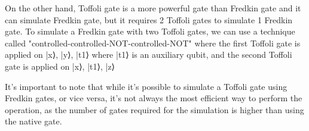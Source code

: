 On the other hand, Toffoli gate is a more powerful gate than Fredkin gate and it can simulate Fredkin gate, but it requires 2 Toffoli gates to simulate 1 Fredkin gate. To simulate a Fredkin gate with two Toffoli gates, we can use a technique called "controlled-controlled-NOT-controlled-NOT" where the first Toffoli gate is applied on |x⟩, |y⟩, |t1⟩ where |t1⟩ is an auxiliary qubit, and the second Toffoli gate is applied on |x⟩, |t1⟩, |z⟩

It's important to note that while it's possible to simulate a Toffoli gate using Fredkin gates, or vice versa, it's not always the most efficient way to perform the operation, as the number of gates required for the simulation is higher than using the native gate.